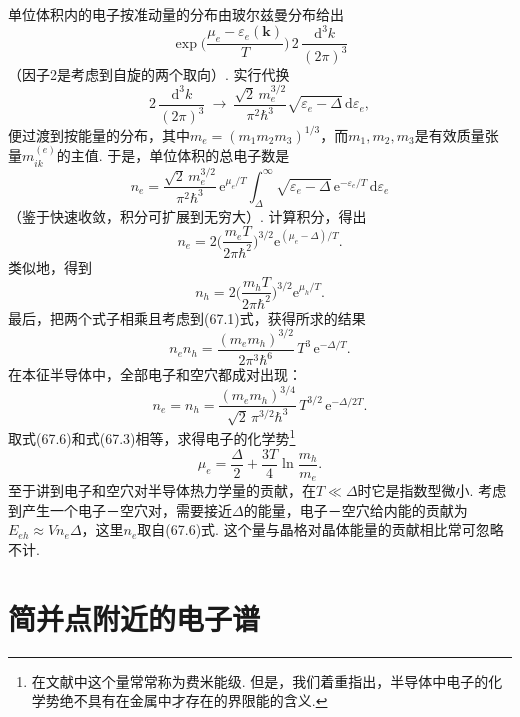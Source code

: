 单位体积内的电子按准动量的分布由玻尔兹曼分布给出
\begin{equation*}
\exp\biggl(\frac{\mu_e-\varepsilon_e(\bm{k})}{T}\biggr)
\,2\,\frac{\mathrm{d}^3k}{(2\pi)^3}
\end{equation*}
（因子2是考虑到自旋的两个取向）. 实行代换
\begin{equation*}
2\,\frac{\mathrm{d}^3k}{(2\pi)^3}\ \longrightarrow\
\frac{\sqrt{2}\,m^{3/2}_e}{\pi^2\hbar^3}\sqrt{\varepsilon_e-\Delta}\,
\mathrm{d}\varepsilon_e,
\end{equation*}
便过渡到按能量的分布，其中$m_e=(m_1m_2m_3)^{1/3}$，而$m_1,m_2,m_3$是有效质量张量$m^{(e)}_{ik}$的主值. 于是，单位体积的总电子数是
\begin{equation*}
n_e=\frac{\sqrt{2}\,m^{3/2}_e}{\pi^2\hbar^3}\,
\mathrm{e}^{\mu_e/T}\int_{\Delta}^{\infty}
\sqrt{\varepsilon_e-\Delta}\,\mathrm{e}^{-\varepsilon_e/T}\,\mathrm{d}\varepsilon_e
\end{equation*}
（鉴于快速收敛，积分可扩展到无穷大）. 计算积分，得出
\begin{equation}
n_e=2\biggl(\frac{m_eT}{2\pi\hbar^2}\biggr)^{3/2}
\mathrm{e}^{(\mu_e-\Delta)/T}.
\end{equation}
类似地，得到
\begin{equation}
n_h=2\biggl(\frac{m_hT}{2\pi\hbar^2}\biggr)^{3/2}\mathrm{e}^{\mu_h/T}.
\end{equation}
最后，把两个式子相乘且考虑到(67.1)式，获得所求的结果
\begin{equation}
n_en_h=\frac{(m_em_h)^{3/2}}{2\pi^3\hbar^6}\,T^3\,\mathrm{e}^{-\Delta/T}.
\end{equation}
在本征半导体中，全部电子和空穴都成对出现：
\begin{equation}
n_e=n_h=\frac{(m_em_h)^{3/4}}{\sqrt{2}\,\pi^{3/2}\hbar^3}\,
T^{3/2}\,\mathrm{e}^{-\Delta/2T}.
\end{equation}
取式(67.6)和式(67.3)相等，求得电子的化学势\footnote{在文献中这个量常常称为费米能级. 但是，我们着重指出，半导体中电子的化学势绝不具有在金属中才存在的界限能的含义.}
\begin{equation}
\mu_e=\frac{\Delta}{2}+\frac{3T}{4}\ln\frac{m_h}{m_e}.
\end{equation}
至于讲到电子和空穴对半导体热力学量的贡献，在$T\ll\Delta$时它是指数型微小. 考虑到产生一个电子－空穴对，需要接近$\Delta$的能量，电子－空穴给内能的贡献为$E_{eh}\approx Vn_e\Delta$，这里$n_e$取自(67.6)式. 这个量与晶格对晶体能量的贡献相比常可忽略不计.

\section{简并点附近的电子谱}

